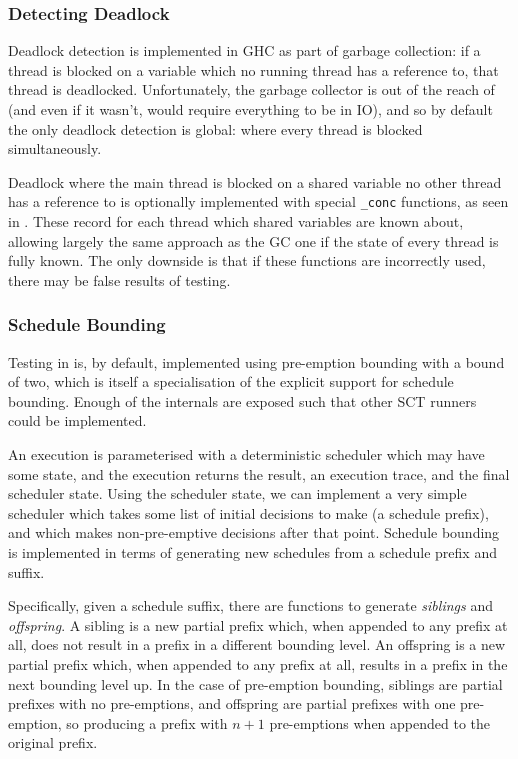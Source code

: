 \subsubsection*{Detecting Deadlock}
\label{sec:prelims-dejafu-impl-tests}

Deadlock detection is implemented in GHC as part of garbage
collection: if a thread is blocked on a variable which no running
thread has a reference to, that thread is deadlocked. Unfortunately,
the garbage collector is out of the reach of \dejafu{} (and even if it
wasn't, would require everything to be in IO), and so by default the
only deadlock detection is global: where every thread is blocked
simultaneously.

Deadlock where the main thread is blocked on a shared variable no
other thread has a reference to is optionally implemented with special
\texttt{\_conc} functions, as seen in . These record for
each thread which shared variables are known about, allowing largely
the same approach as the GC one if the state of every thread is fully
known. The only downside is that if these functions are incorrectly
used, there may be false results of testing.

\subsubsection*{Schedule Bounding}
\label{sec:prelims-dejafu-impl-bound}

Testing in \dejafu{} is, by default, implemented using pre-emption
bounding with a bound of two, which is itself a specialisation of the
explicit support for schedule bounding. Enough of the internals are
exposed such that other SCT runners could be implemented.

An execution is parameterised with a deterministic scheduler which may
have some state, and the execution returns the result, an execution
trace, and the final scheduler state. Using the scheduler state, we
can implement a very simple scheduler which takes some list of initial
decisions to make (a schedule prefix), and which makes non-pre-emptive
decisions after that point. Schedule bounding is implemented in terms
of generating new schedules from a schedule prefix and suffix.

Specifically, given a schedule suffix, there are functions to generate
\textit{siblings} and \textit{offspring}. A sibling is a new partial
prefix which, when appended to any prefix at all, does not result in a
prefix in a different bounding level. An offspring is a new partial
prefix which, when appended to any prefix at all, results in a prefix
in the next bounding level up. In the case of pre-emption bounding,
siblings are partial prefixes with no pre-emptions, and offspring are
partial prefixes with one pre-emption, so producing a prefix with
$n+1$ pre-emptions when appended to the original prefix.

